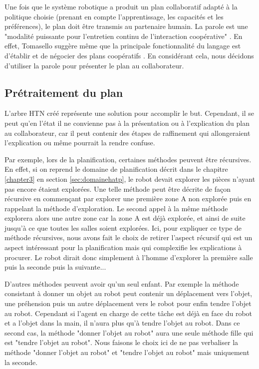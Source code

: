 \documentclass[a4paper,11pt,twoside]{StyleThese}
\begin{document}
Une fois que le système robotique a produit un plan collaboratif adapté à la politique choisie (prenant en compte l'apprentissage, les capacités et les préférences), le plan doit être transmis au partenaire humain.
La parole est une "modalité puissante pour l'entretien continu de l'interaction coopérative" \cite{Lallee2013}. En effet, Tomasello suggère même que la principale fonctionnalité du langage est d'établir et de négocier des plans coopératifs \cite{tomasello2005}.
En considérant cela, nous décidons d'utiliser la parole pour présenter le plan au collaborateur.

\subsection{Prétraitement du plan}

L'arbre HTN créé représente une solution pour accomplir le but. Cependant, il se peut qu'en l'état il ne convienne pas à la présentation ou à l'explication du plan au collaborateur, car il peut contenir des étapes de raffinement qui allongeraient l'explication ou même pourrait la rendre confuse.

Par exemple, lors de la planification, certaines méthodes peuvent être récursives. En effet, si on reprend le domaine de planification décrit dans le chapitre \ref{chapter3} en section \ref{sec:domainehatp}, le robot devait explorer les pièces n'ayant pas encore étaient explorées. Une telle méthode peut être décrite de façon récursive en commençant par explorer une première zone A non explorée puis en rappelant la méthode d'exploration. Le second appel à la même méthode explorera alors une autre zone car la zone A est déjà explorée, et ainsi de suite jusqu'à ce que toutes les salles soient explorées. 
Ici, pour expliquer ce type de méthode récursives, nous avons fait le choix de retirer l'aspect récursif qui est un aspect intéressant pour la planification mais qui complexifie les explications à procurer. Le robot dirait donc simplement à l'homme d'explorer la première salle puis la seconde puis la suivante...

D'autres méthodes peuvent avoir qu'un seul enfant. Par exemple la méthode consistant à donner un objet au robot peut contenir un déplacement vers l'objet, une préhension puis un autre déplacement vers le robot pour enfin tendre l'objet au robot. Cependant si l'agent en charge de cette tâche est déjà en face du robot et a l'objet dans la main, il n'aura plus qu'à tendre l'objet au robot. Dans ce second cas, la méthode "donner l'objet au robot" aura une seule méthode fille qui est "tendre l'objet au robot". Nous faisons le choix ici de ne pas verbaliser la méthode "donner l'objet au robot" et "tendre l'objet au robot" mais uniquement la seconde.
\end{document}
